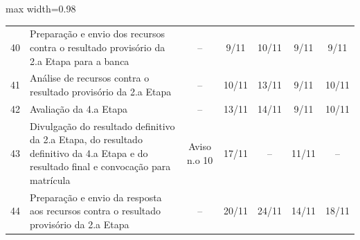 \begin{landscape}
\begin{quadro}[htb]
\begin{adjustbox}{max width=0.98\linewidth}
\begin{tabular}{|c|l|c|c|c|c|c|}
40 & Preparação e envio   dos recursos contra o resultado provisório da 2.a Etapa para a banca                                                  & –                   & 9/11                                                                            & 10/11                                 & 9/11                                                                            & 9/11                 \\
\rowcolor[HTML]{FCD5B4} 
41 & Análise de recursos   contra o resultado provisório da 2.a Etapa                                                                           & –                   & 10/11                                                                           & 13/11                                 & 9/11                                                                            & 10/11                \\
42 & Avaliação da 4.a   Etapa                                                                                                                   & –                   & 13/11                                                                           & 14/11                                 & 9/11                                                                            & 10/11                \\
\rowcolor[HTML]{92CDDC} 
43 & Divulgação do   resultado definitivo da 2.a Etapa, do resultado definitivo da 4.a Etapa e do   resultado final e convocação para matrícula & Aviso n.o 10        & 17/11                                                                           & –                                     & 11/11                                                                           & –                    \\
44 & Preparação e envio da   resposta aos recursos contra o resultado provisório da 2.a Etapa                                                   & –                   & 20/11                                                                           & 24/11                                 & 14/11                                                                           & 18/11 \\      \hline        
\end{tabular}

\end{adjustbox}
\end{quadro}
\end{landscape}


